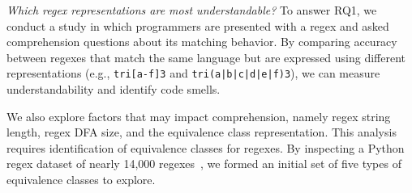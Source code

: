 
%
%

 {\em Which regex representations are most understandable?}
To answer RQ1, we conduct a study in which programmers are presented with a regex and asked comprehension questions about its matching behavior. By comparing accuracy between  regexes that match the same language but are expressed using different representations (e.g., \verb!tri[a-f]3! and \verb!tri(a|b|c|d|e|f)3!), we can measure understandability and identify code smells.

We also explore factors that may impact comprehension, namely regex string length, regex DFA size, and the equivalence class representation.
This analysis requires identification of equivalence classes for regexes. By inspecting a Python regex dataset of nearly 14,000 regexes~\cite{chapman2016}, we formed an initial set of five types of equivalence classes to explore.


